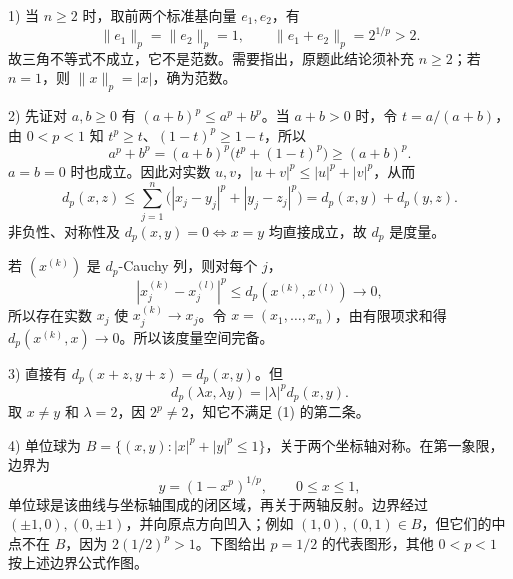 \documentclass{article}
\begin{document}
1) 当 $n\ge2$ 时，取前两个标准基向量 $e_1,e_2$，有
\[
\|e_1\|_p=\|e_2\|_p=1,\qquad
\|e_1+e_2\|_p=2^{1/p}>2.
\]
故三角不等式不成立，它不是范数。需要指出，原题此结论须补充 $n\ge2$；若 $n=1$，则 $\|x\|_p=|x|$，确为范数。

2) 先证对 $a,b\ge0$ 有 $(a+b)^p\le a^p+b^p$。当 $a+b>0$ 时，令 $t=a/(a+b)$，由 $0<p<1$ 知 $t^p\ge t$、$(1-t)^p\ge1-t$，所以
\[
a^p+b^p=(a+b)^p\bigl(t^p+(1-t)^p\bigr)\ge(a+b)^p.
\]
$a=b=0$ 时也成立。因此对实数 $u,v$，$|u+v|^p\le|u|^p+|v|^p$，从而
\[
d_p(x,z)\le\sum_{j=1}^n\bigl(|x_j-y_j|^p+|y_j-z_j|^p\bigr)=d_p(x,y)+d_p(y,z).
\]
非负性、对称性及 $d_p(x,y)=0\iff x=y$ 均直接成立，故 $d_p$ 是度量。

若 $(x^{(k)})$ 是 $d_p$-Cauchy 列，则对每个 $j$，
\[
|x_j^{(k)}-x_j^{(l)}|^p\le d_p(x^{(k)},x^{(l)})\to0,
\]
所以存在实数 $x_j$ 使 $x_j^{(k)}\to x_j$。令 $x=(x_1,\ldots,x_n)$，由有限项求和得 $d_p(x^{(k)},x)\to0$。所以该度量空间完备。

3) 直接有 $d_p(x+z,y+z)=d_p(x,y)$。但
\[
d_p(\lambda x,\lambda y)=|\lambda|^p d_p(x,y).
\]
取 $x\ne y$ 和 $\lambda=2$，因 $2^p\ne2$，知它不满足 (1) 的第二条。

\par\medskip\noindent\begin{minipage}{\linewidth}
4) 单位球为 $B=\{(x,y):|x|^p+|y|^p\le1\}$，关于两个坐标轴对称。在第一象限，边界为
\[
y=(1-x^p)^{1/p},\qquad0\le x\le1,
\]
单位球是该曲线与坐标轴围成的闭区域，再关于两轴反射。边界经过 $(\pm1,0),(0,\pm1)$，并向原点方向凹入；例如 $(1,0),(0,1)\in B$，但它们的中点不在 $B$，因为 $2(1/2)^p>1$。下图给出 $p=1/2$ 的代表图形，其他 $0<p<1$ 按上述边界公式作图。
\begin{center}
\end{center}
\end{minipage}
\end{document}
